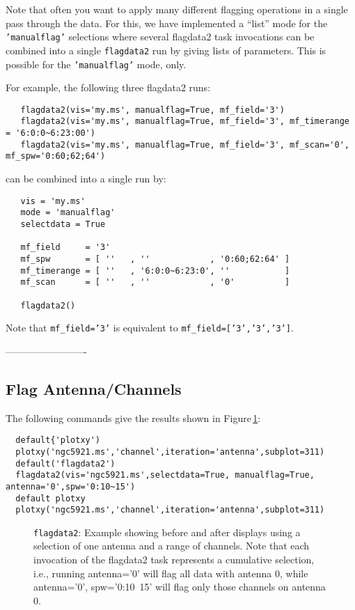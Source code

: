 Note that often you want to apply many different flagging operations
in a single pass through the data.  For this, we have implemented
a ``list'' mode for the {\tt 'manualflag'} selections where
several flagdata2 task invocations can be combined into a single
{\tt flagdata2} run by giving lists of parameters. 
This is possible for the {\tt 'manualflag'} mode, only.
    
For example, the following three flagdata2 runs:
\small
\begin{verbatim}
   flagdata2(vis='my.ms', manualflag=True, mf_field='3')
   flagdata2(vis='my.ms', manualflag=True, mf_field='3', mf_timerange = '6:0:0~6:23:00')
   flagdata2(vis='my.ms', manualflag=True, mf_field='3', mf_scan='0', mf_spw='0:60;62;64')
\end{verbatim}
\normalsize
can be combined into a single run by:
\small
\begin{verbatim}
   vis = 'my.ms'
   mode = 'manualflag'
   selectdata = True
   
   mf_field     = '3'
   mf_spw       = [ ''   , ''            , '0:60;62:64' ]
   mf_timerange = [ ''   , '6:0:0~6:23:0', ''           ]
   mf_scan      = [ ''   , ''            , '0'          ]
   
   flagdata2()
\end{verbatim}
\normalsize
Note that {\tt mf\_field='3'} is equivalent to {\tt mf\_field=['3','3','3']}.

-------------------------
\subsection{Flag Antenna/Channels}
\label{section:edit.flagdata.ant}

The following commands give the results shown in 
Figure\,\ref{fig:flagdata_antchan}:
\small
\begin{verbatim}
  default{'plotxy')
  plotxy('ngc5921.ms','channel',iteration='antenna',subplot=311)
  default('flagdata2')
  flagdata2(vis='ngc5921.ms',selectdata=True, manualflag=True, antenna='0',spw='0:10~15')
  default plotxy
  plotxy('ngc5921.ms','channel',iteration='antenna',subplot=311)
\end{verbatim}
\normalsize

\begin{figure}[h!]
\begin{center}
\caption{\label{fig:flagdata_antchan} {\tt flagdata2}: Example showing before
  and after displays using a selection of one antenna and a range of
  channels. Note that each invocation of the flagdata2 task represents
  a cumulative selection, i.e., running antenna='0' will flag all
  data with antenna 0, while antenna='0', spw='0:10~15'
  will flag only those channels on antenna 0. }
\hrulefill
\end{center}
\end{figure}


